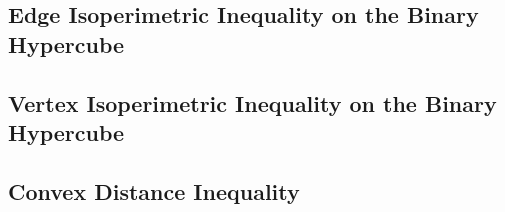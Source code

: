 \documentclass[11pt]{article}
\begin{document}
\subsection{Edge Isoperimetric Inequality on the Binary Hypercube}
\subsection{Vertex Isoperimetric Inequality on the Binary Hypercube}
\subsection{Convex Distance Inequality}








\newpage


\end{document}

